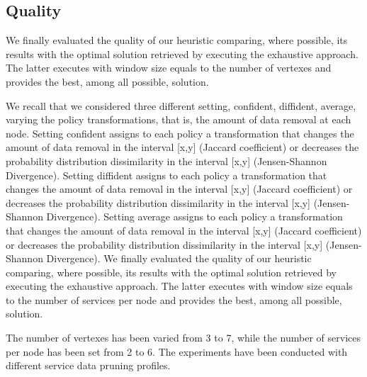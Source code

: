 \subsection{Quality}\label{subsec:experiments_quality}
We finally evaluated the quality of our heuristic comparing, where possible, its results with the optimal solution retrieved by executing the exhaustive approach. The latter executes with window size equals to the number of vertexes and provides the best, among all possible, solution.

We recall that we considered three different setting, confident, diffident, average, varying the policy transformations, that is, the amount of data removal at each node. Setting confident assigns to each policy a transformation that changes the amount of data removal in the interval [x,y] (Jaccard coefficient) or decreases the probability distribution dissimilarity in the interval [x,y] (Jensen-Shannon Divergence). Setting diffident assigns to each policy a transformation that changes the amount of data removal in the interval [x,y] (Jaccard coefficient) or decreases the probability distribution dissimilarity in  the interval [x,y] (Jensen-Shannon Divergence). Setting average assigns to each policy a transformation that changes the amount of data removal in the interval [x,y] (Jaccard coefficient) or decreases the probability distribution dissimilarity in  the interval [x,y] (Jensen-Shannon Divergence).
We finally evaluated the quality of our heuristic comparing, where possible,
its results with the optimal solution retrieved by executing the exhaustive approach.
The latter executes with window size equals to the number of services per node and provides the best,
among all possible, solution.

The number of vertexes has been varied from 3 to 7, while the number of services per node has been set from 2 to 6.
The experiments have been conducted with different service data pruning profiles.



